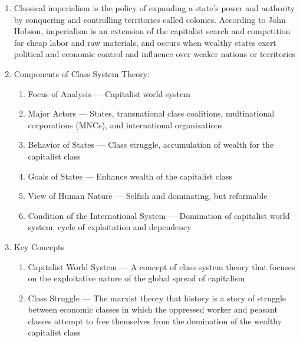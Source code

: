 \documentclass[12pt]{article}
\begin{document}
\begin{enumerate}
      \item Classical imperialism is the policy of expanding a state's power and authority by conquering and controlling territories called colonies. According to John Hobson, imperialism is an extension of the capitalist search and competition for cheap labor and raw materials, and occurs when wealthy states exert political and economic control and influence over weaker nations or territories

      \item Components of Class System Theory:

        \begin{enumerate}

          \item Focus of Analysis — Capitalist world system

          \item Major Actors — States, transnational class coalitions, multinational corporations (MNCs), and international organizations

          \item Behavior of States — Class struggle, accumulation of wealth for the capitalist class

          \item Goals of States — Enhance wealth of the capitalist class

          \item View of Human Nature — Selfish and dominating, but reformable

          \item Condition of the International System — Domination of capitalist world system, cycle of exploitation and dependency

        \end{enumerate}

      \item Key Concepts

        \begin{enumerate}

          \item Capitalist World System — A concept of class system theory that focuses on the exploitative nature of the global spread of capitalism

          \item Class Struggle — The marxist theory that history is a story of struggle between economic classes in which the oppressed worker and peasant classes attempt to free themselves from the domination of the wealthy capitalist class


\end{enumerate}
\end{enumerate}
\end{document}
